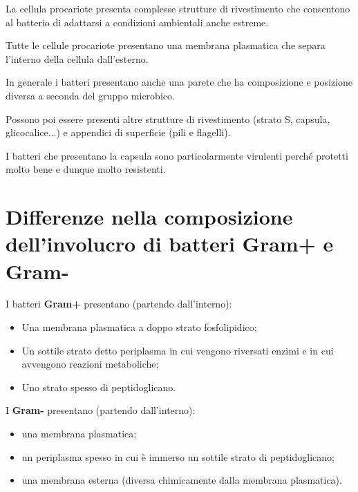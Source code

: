 \documentclass[11pt]{book}
\begin{document}
La cellula procariote presenta complesse strutture di rivestimento che consentono al batterio di adattarsi a condizioni ambientali anche estreme.

Tutte le cellule procariote presentano una membrana plasmatica che separa l'interno della cellula dall'esterno. 

In generale i batteri presentano anche una parete che ha composizione e posizione diversa a seconda del gruppo microbico.

Possono poi essere presenti altre strutture di rivestimento (strato S, capsula, glicocalice...) e appendici di superficie (pili e flagelli).

I batteri che presentano la capsula sono particolarmente virulenti perché protetti molto bene e dunque molto resistenti.

\section{Differenze nella composizione dell'involucro di batteri Gram+ e Gram-}
I batteri \textbf{Gram+} presentano (partendo dall'interno):
\begin{itemize}
\item Una membrana plasmatica a doppo strato fosfolipidico;
\item Un sottile strato detto periplasma in cui vengono riversati enzimi e in cui avvengono reazioni metaboliche;
\item Uno strato spesso di peptidoglicano.
\end{itemize}

I \textbf{Gram-} presentano (partendo dall'interno):
\begin{itemize}
\item una membrana plasmatica;
\item un periplasma spesso in cui è immerso un sottile strato di peptidoglicano;
\item una membrana esterna (diversa chimicamente dalla membrana plasmatica).
\end{itemize}
\end{document}
